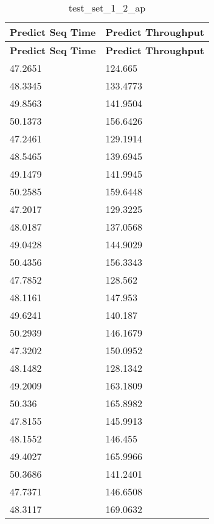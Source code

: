 \documentclass[bwprint]{gmcmthesis}
\begin{document}
\begin{longtable}{ll}
\caption{test\_set\_1\_2\_ap} \\ %
\hline
\textbf{Predict Seq Time} & \textbf{Predict Throughput} \\ 
\hline
\endfirsthead

\hline
\textbf{Predict Seq Time} & \textbf{Predict Throughput} \\ 
\hline
\endhead

\hline
\endfoot

47.2651           & 124.665            \\
48.3345           & 133.4773           \\
49.8563           & 141.9504           \\
50.1373           & 156.6426           \\
47.2461           & 129.1914           \\
48.5465           & 139.6945           \\
49.1479           & 141.9945           \\
50.2585           & 159.6448           \\
47.2017           & 129.3225           \\
48.0187           & 137.0568           \\
49.0428           & 144.9029           \\
50.4356           & 156.3343           \\
47.7852           & 128.562            \\
48.1161           & 147.953            \\
49.6241           & 140.187            \\
50.2939           & 146.1679           \\
47.3202           & 150.0952           \\
48.1482           & 128.1342           \\
49.2009           & 163.1809           \\
50.336            & 165.8982           \\
47.8155           & 145.9913           \\
48.1552           & 146.455            \\
49.4027           & 165.9966           \\
50.3686           & 141.2401           \\
47.7371           & 146.6508           \\
48.3117           & 169.0632           \\

\end{longtable}
\end{document}
